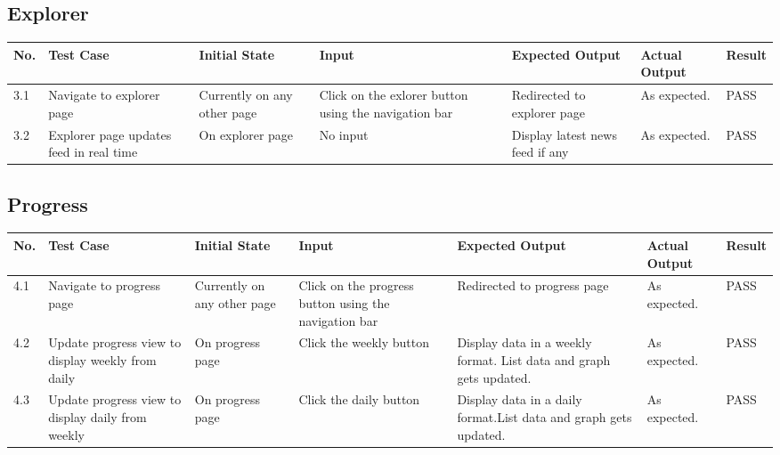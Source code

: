 \documentclass{article}
\begin{document}
\subsection{Explorer}
\begingroup
\begin{tabular}{ | p{0.5cm} | p{2cm} | p{2cm} | p{2cm} |p{2cm} |p{2cm} |p{1cm} |} 
    \hline
    \textbf{No.} & \textbf{Test Case} & \textbf{Initial State} & \textbf{Input}& \textbf{Expected Output}& \textbf{Actual Output}& \textbf{Result}\\
    \hline
    3.1 & Navigate to explorer page & Currently on any other page &  Click on the exlorer button using the navigation bar & Redirected to explorer page & As expected. & PASS\\
    \hline
    3.2 & Explorer page updates feed in real time & On explorer page & No input & Display latest news feed if any & As expected. & PASS\\
    \hline
\end{tabular}
\endgroup


\subsection{Progress}
\begingroup
\begin{tabular}{ | p{0.5cm} | p{2cm} | p{2cm} | p{2cm} |p{2cm} |p{2cm} |p{1cm} |} 
    \hline
    \textbf{No.} & \textbf{Test Case} & \textbf{Initial State} & \textbf{Input}& \textbf{Expected Output}& \textbf{Actual Output}& \textbf{Result}\\
    \hline
    4.1 & Navigate to progress page & Currently on any other page &  Click on the progress button using the navigation bar & Redirected to progress page & As expected. & PASS\\
    \hline
    4.2 & Update progress view to display weekly from daily & On progress page & Click the weekly button & Display data in a weekly format. List data and graph gets updated.  & As expected. & PASS\\
    \hline
    4.3 & Update progress view to display daily from weekly & On progress page & Click the daily button & Display data in a daily format.List data and graph gets updated. & As expected. & PASS\\
    \hline
\end{tabular}
\endgroup
\end{document}

